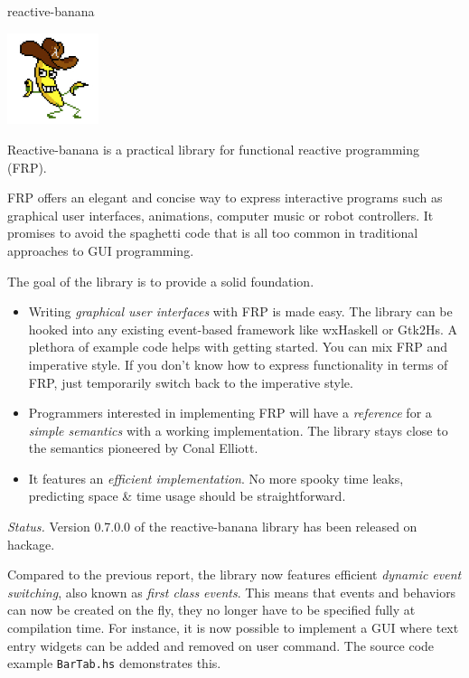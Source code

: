 \begin{hcarentry}[updated]{reactive-banana}
\makeheader

\begin{center}
\includegraphics[width=0.2\textwidth]{html/banana.jpg}
\end{center}

Reactive-banana is a practical library for functional reactive programming (FRP).

FRP offers an elegant and concise way to express interactive programs such as graphical user interfaces, animations, computer music or robot controllers. It promises to avoid the spaghetti code that is all too common in traditional approaches to GUI programming.

The goal of the library is to provide a solid foundation.
\begin{itemize}
\item Writing \emph{graphical user interfaces} with FRP is made easy. The library can be hooked into any existing event-based framework like wxHaskell or Gtk2Hs. A plethora of example code helps with getting started. You can mix FRP and imperative style. If you don't know how to express functionality in terms of FRP, just temporarily switch back to the imperative style.
\item Programmers interested in implementing FRP will have a \emph{reference} for a \emph{simple semantics} with a working implementation. The library stays close to the semantics pioneered by Conal Elliott.
\item It features an \emph{efficient implementation}. No more spooky time leaks, predicting space \& time usage should be straightforward.
\end{itemize}

\emph{Status.} Version 0.7.0.0 of the reactive-banana library has been released on hackage.

Compared to the previous report, the library now features efficient \emph{dynamic event switching}, also known as \emph{first class events}. This means that events and behaviors can now be created on the fly, they no longer have to be specified fully at compilation time. For instance, it is now possible to implement a GUI where text entry widgets can be added and removed on user command. The source code example \verb!BarTab.hs! demonstrates this.


\end{hcarentry}
